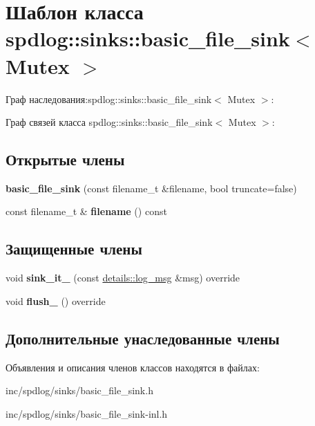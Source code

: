 \hypertarget{classspdlog_1_1sinks_1_1basic__file__sink}{}\section{Шаблон класса spdlog\+:\+:sinks\+:\+:basic\+\_\+file\+\_\+sink$<$ Mutex $>$}
\label{classspdlog_1_1sinks_1_1basic__file__sink}


Граф наследования\+:spdlog\+:\+:sinks\+:\+:basic\+\_\+file\+\_\+sink$<$ Mutex $>$\+:


Граф связей класса spdlog\+:\+:sinks\+:\+:basic\+\_\+file\+\_\+sink$<$ Mutex $>$\+:
\subsection*{Открытые члены}
\begin{DoxyCompactItemize}
\item 
\mbox{\label{classspdlog_1_1sinks_1_1basic__file__sink_a52541e42ae948560f792b29361867039}} 
{\bfseries basic\+\_\+file\+\_\+sink} (const filename\+\_\+t \&filename, bool truncate=false)
\item 
\mbox{\label{classspdlog_1_1sinks_1_1basic__file__sink_a96a62063ecc1813d38a0a8367d1ee710}} 
const filename\+\_\+t \& {\bfseries filename} () const
\end{DoxyCompactItemize}
\subsection*{Защищенные члены}
\begin{DoxyCompactItemize}
\item 
\mbox{\label{classspdlog_1_1sinks_1_1basic__file__sink_a991753f0cba5967d62010d20db98ac8f}} 
void {\bfseries sink\+\_\+it\+\_\+} (const \hyperlink{structspdlog_1_1details_1_1log__msg}{details\+::log\+\_\+msg} \&msg) override
\item 
\mbox{\label{classspdlog_1_1sinks_1_1basic__file__sink_ae2aed97832203ee66fb2f70399f4cd49}} 
void {\bfseries flush\+\_\+} () override
\end{DoxyCompactItemize}
\subsection*{Дополнительные унаследованные члены}


Объявления и описания членов классов находятся в файлах\+:\begin{DoxyCompactItemize}
\item 
inc/spdlog/sinks/basic\+\_\+file\+\_\+sink.\+h\item 
inc/spdlog/sinks/basic\+\_\+file\+\_\+sink-\/inl.\+h\end{DoxyCompactItemize}
